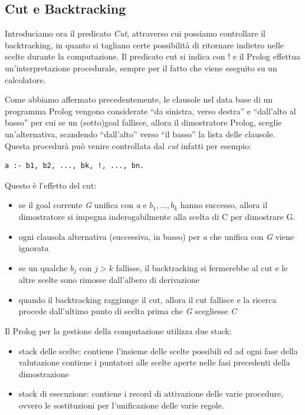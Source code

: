 \subsection{Cut e Backtracking}
Introduciamo ora il predicato \emph{Cut}, attraverso cui possiamo controllare il backtracking, in quanto si tagliano certe possibilità
di ritornare indietro nelle scelte durante la computazione.\newline
Il predicato cut si indica con $!$ e il Prolog effettua un'interpretazione procedurale, sempre per il fatto che viene eseguito su un calcolatore.

Come abbiamo affermato precedentemente, le clausole nel data base di un programma Prolog vengono considerate “da sinistra, verso destra”
e “dall'alto al basso” per cui se un (sotto)goal fallisce, allora il dimostratore Prolog, sceglie un'alternativa,
scandendo “dall'alto” verso “il basso” la lista delle clausole.\newline
Questa procedurà può venire controllata dal \textit{cut} infatti per esempio:
\begin{verbatim}
a :- b1, b2, ..., bk, !, ..., bn.
\end{verbatim}
Questo è l'effetto del cut:
\begin{itemize}
\item se il goal corrente \textit{G} unifica con \textit{a} e $b_1,...,b_k$ hanno successo,
      allora il dimostratore si impegna inderogabilmente alla scelta di C per dimostrare G.
\item ogni clausola alternativa (successiva, in basso) per \textit{a} che unifica con \textit{G} viene ignorata
\item se un qualche $b_j$ con $j > k$ fallisse, il backtracking si fermerebbe al cut e le altre scelte sono rimosse dall'albero di derivazione
\item quando il backtracking raggiunge il cut, allora il cut fallisce e la ricerca procede dall’ultimo punto di scelta
      prima che \textit{G} scegliesse \textit{C}
\end{itemize}
Il Prolog per la gestione della computazione utilizza due stack:
\begin{itemize}
\item stack delle scelte: contiene l'insieme delle scelte possibili ed ad ogni fase della valutazione contiene i puntatori alle
      scelte aperte nelle fasi precedenti della dimostrazione
\item stack di esecuzione: contiene i record di attivazione delle varie procedure, ovvero le sostituzioni per l'unificazione delle varie regole.
\end{itemize}
